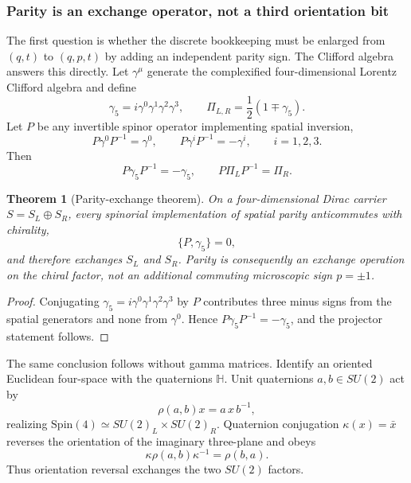 \documentclass[11pt]{article}
\newtheorem{theorem}{Theorem}[section]
\theoremstyle{definition}\newtheorem{definition}[theorem]{Definition}
\theoremstyle{remark}\newtheorem{remark}[theorem]{Remark}\newtheorem{conjecture}[theorem]{Conjecture}
\begin{document}
\subsubsection{Parity is an exchange operator, not a third orientation bit}\label{subsubsec:parityexchange}
The first question is whether the discrete bookkeeping must be enlarged from $(q,t)$ to $(q,p,t)$ by adding an independent parity sign. The Clifford algebra answers this directly. Let $\gamma^\mu$ generate the complexified four-dimensional Lorentz Clifford algebra and define
\begin{equation}
 \gamma_5=i\gamma^0\gamma^1\gamma^2\gamma^3,
 \qquad
 \Pi_{L,R}=\frac12(1\mp\gamma_5).
\end{equation}
Let $P$ be any invertible spinor operator implementing spatial inversion,
\begin{equation}
 P\gamma^0P^{-1}=\gamma^0,
 \qquad
 P\gamma^iP^{-1}=-\gamma^i,
 \qquad i=1,2,3.
\end{equation}
Then
\begin{equation}\label{eq:Pgamma5}
 \boxed{P\gamma_5P^{-1}=-\gamma_5,\qquad P\Pi_LP^{-1}=\Pi_R.}
\end{equation}

\begin{theorem}[Parity-exchange theorem]\label{thm:parityexchange}
On a four-dimensional Dirac carrier $S=S_L\oplus S_R$, every spinorial implementation of spatial parity anticommutes with chirality,
\begin{equation}
 \boxed{\{P,\gamma_5\}=0,}
\end{equation}
and therefore exchanges $S_L$ and $S_R$. Parity is consequently an exchange operation on the chiral factor, not an additional commuting microscopic sign $p=\pm1$.
\end{theorem}
\begin{proof}
Conjugating $\gamma_5=i\gamma^0\gamma^1\gamma^2\gamma^3$ by $P$ contributes three minus signs from the spatial generators and none from $\gamma^0$. Hence $P\gamma_5P^{-1}=-\gamma_5$, and the projector statement follows.
\end{proof}

The same conclusion follows without gamma matrices. Identify an oriented Euclidean four-space with the quaternions $\mathbb H$. Unit quaternions $a,b\in SU(2)$ act by
\begin{equation}
 \rho(a,b)x=a\,x\,b^{-1},
\end{equation}
realizing $\mathrm{Spin}(4)\simeq SU(2)_L\times SU(2)_R$. Quaternion conjugation $\kappa(x)=\bar x$ reverses the orientation of the imaginary three-plane and obeys
\begin{equation}\label{eq:quaternionparity}
 \boxed{\kappa\rho(a,b)\kappa^{-1}=\rho(b,a).}
\end{equation}
Thus orientation reversal exchanges the two $SU(2)$ factors.
\end{document}
